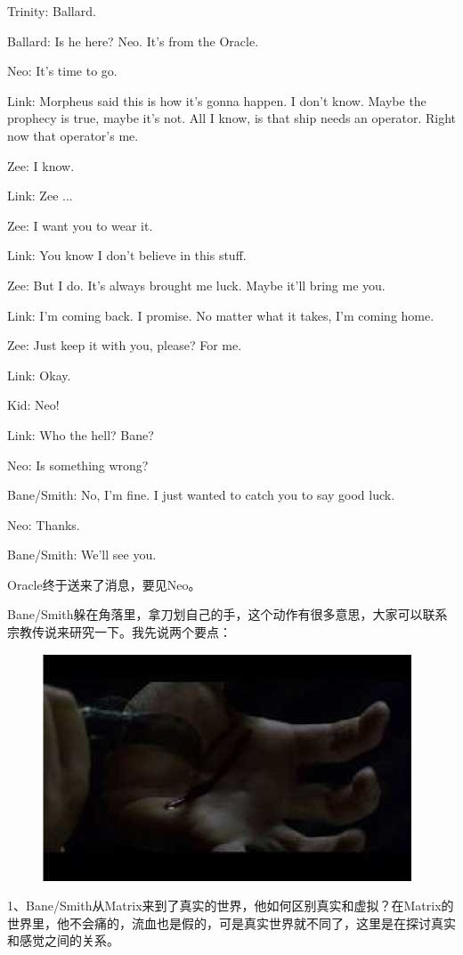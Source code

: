 \documentclass{ctexart}
\newenvironment{myquote}{\color{green} \setlength{\leftskip}{6em} \setlength{\rightskip}{4em} \setlength{\parindent}{-2em}}{\par}
\begin{document}
\begin{myquote}
Trinity: Ballard.

Ballard: Is he here? Neo. It's from the Oracle.

Neo: It's time to go.

Link: Morpheus said this is how it's gonna happen. I don't know. Maybe the prophecy is true, maybe it's not. All I know, is that ship needs an operator. Right now that operator's me.

Zee: I know.

Link: Zee ...

Zee: I want you to wear it.

Link: You know I don't believe in this stuff.

Zee: But I do. It's always brought me luck. Maybe it'll bring me you.

Link: I'm coming back. I promise. No matter what it takes, I'm coming home.

Zee: Just keep it with you, please? For me.

Link: Okay.

Kid: Neo!

Link: Who the hell? Bane?

Neo: Is something wrong?

Bane/Smith: No, I'm fine. I just wanted to catch you to say good luck.

Neo: Thanks.

Bane/Smith: We'll see you.
\end{myquote}

Oracle终于送来了消息，要见Neo。

Bane/Smith躲在角落里，拿刀划自己的手，这个动作有很多意思，大家可以联系宗教传说来研究一下。我先说两个要点：

\begin{figure}[htb]
\centering
\includegraphics[width=0.5\linewidth]{fig/read_reloaded-53}
\end{figure}

1、Bane/Smith从Matrix来到了真实的世界，他如何区别真实和虚拟？在Matrix的世界里，他不会痛的，流血也是假的，可是真实世界就不同了，这里是在探讨真实和感觉之间的关系。
\end{document}
